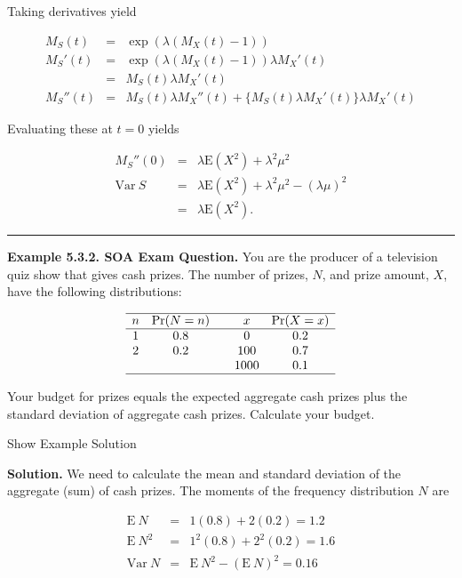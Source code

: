 \documentclass[]{book}
\theoremstyle{definition}
\theoremstyle{definition}
\theoremstyle{definition}
\theoremstyle{remark}
\begin{document}
Taking derivatives yield

\begin{eqnarray*}
M_{S}(t) &=&\exp(\lambda(M_{X}(t) - 1))\\
M_{S}'(t) &=&\exp(\lambda(M_{X}(t) - 1)) \lambda M_{X}'(t)\\
&=& M_{S}(t) \lambda M_{X}'(t)\\
M_{S}''(t) &=& M_{S}(t) \lambda M_{X}''(t) + \{M_{S}(t) \lambda M_{X}'(t)\} \lambda M_{X}'(t)
\end{eqnarray*}

Evaluating these at \(t=0\) yields

\begin{eqnarray*}
M_{S}''(0) &=& \lambda \mathrm{E}(X^2) + \lambda^2 \mu^2\\
\mathrm{Var~}S &=& \lambda \mathrm{E}(X^2) + \lambda^2 \mu^2 - (\lambda \mu)^2\\
&=& \lambda \mathrm{E}(X^2).
\end{eqnarray*}

\begin{center}\rule{0.5\linewidth}{\linethickness}\end{center}

\textbf{Example 5.3.2. SOA Exam Question.} You are the producer of a
television quiz show that gives cash prizes. The number of prizes,
\(N\), and prize amount, \(X\), have the following distributions:

\[\begin{matrix}
\begin{array}{ccccc}\hline
    n & \Pr(N=n) & & x & \Pr(X=x)\\ \hline
    1 & 0.8 & & 0 & 0.2 \\
    2 & 0.2 & & 100 & 0.7 \\
       &       & & 1000 & 0.1\\\hline
  \end{array}
\end{matrix}\]

Your budget for prizes equals the expected aggregate cash prizes plus
the standard deviation of aggregate cash prizes. Calculate your budget.

Show Example Solution

\hypertarget{toggleExampleAggLoss.3.2}{}
\textbf{Solution.} We need to calculate the mean and standard deviation
of the aggregate (sum) of cash prizes. The moments of the frequency
distribution \(N\) are

\begin{eqnarray*}
\mathrm{E~}N &=& 1 (0.8) + 2 (0.2) =1.2\\
\mathrm{E~}N^2 &=&  1^2 (0.8) + 2^2 (0.2) =1.6\\
\mathrm{Var~}N &=& \mathrm{E~}N^2 - \left( \mathrm{E~}N \right)^2= 0.16
\end{eqnarray*}
\end{document}
